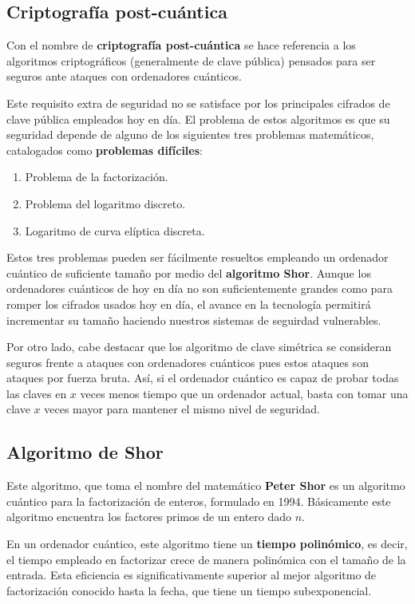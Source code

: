 \documentclass[nochap]{apuntesURJC}
\begin{document}
\subsection{Criptografía post-cuántica}
Con el nombre de \textbf{criptografía post-cuántica} se hace referencia a los algoritmos criptográficos (generalmente de clave pública) pensados para ser seguros ante ataques con ordenadores cuánticos.

Este requisito extra de seguridad no se satisface por los principales cifrados de clave pública empleados hoy en día. El problema de estos algoritmos es que su seguridad depende de alguno de los siguientes tres problemas matemáticos, catalogados como \textbf{problemas difíciles}:
\begin{enumerate}
\item Problema de la factorización.
\item Problema del logaritmo discreto.
\item Logaritmo de curva elíptica discreta.
\end{enumerate}

Estos tres problemas pueden ser fácilmente resueltos empleando un ordenador cuántico de suficiente tamaño por medio del \textbf{algoritmo Shor}. Aunque los ordenadores cuánticos de hoy en día no son suficientemente grandes como para romper los cifrados usados hoy en día, el avance en la tecnología permitirá incrementar su tamaño haciendo nuestros sistemas de seguirdad vulnerables.

Por otro lado, cabe destacar que los algoritmo de clave simétrica se consideran seguros frente a ataques con ordenadores cuánticos pues estos ataques son ataques por fuerza bruta. Así, si el ordenador cuántico es capaz de probar todas las claves en $x$ veces menos tiempo que un ordenador actual, basta con tomar una clave $x$ veces mayor para mantener el mismo nivel de seguridad.

\subsection{Algoritmo de Shor}
Este algoritmo, que toma el nombre del matemático \textbf{Peter Shor} es un algoritmo cuántico para la factorización de enteros, formulado en 1994. Básicamente este algoritmo encuentra los factores primos de un entero dado $n$.

En un ordenador cuántico, este algoritmo tiene un \textbf{tiempo polinómico}, es decir, el tiempo empleado en factorizar crece de manera polinómica con el tamaño de la entrada. Esta eficiencia es significativamente superior al mejor algoritmo de factorización conocido hasta la fecha, que tiene un tiempo subexponencial.
\end{document}
